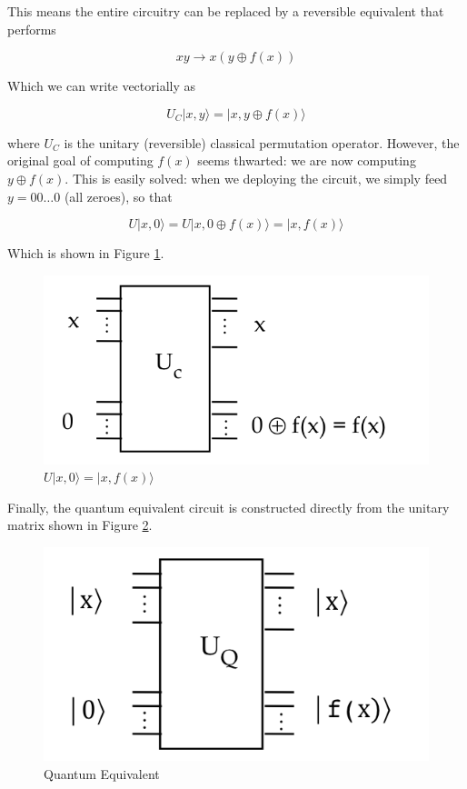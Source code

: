 \documentclass[main.tex]{subfiles}
\begin{document}
    This means the entire circuitry can be replaced by a reversible equivalent that performs
    
    $$
    x y \rightarrow x(y \oplus f(x))
    $$
    
    Which we can write vectorially as
    
    $$
    U_{C}|x, y\rangle=|x, y \oplus f(x)\rangle
    $$
    
    where $U_{C}$ is the unitary (reversible) classical permutation operator. However, the original goal of computing $f(x)$ seems thwarted: we are now computing $y \oplus f(x)$. This is easily solved: when we deploying the circuit, we simply feed $y=00 \ldots 0$ (all zeroes), so that
    
    $$
    U|x, 0\rangle=U|x, 0 \oplus f(x)\rangle=|x, f(x)\rangle
    $$
    
    Which is shown in Figure \ref{fig:35permutation9}.
    
    \begin{figure}
        \centering
        \includegraphics[width=5in]{notes/figs/n10/35permutation9.png}
        \caption{$U|x, 0\rangle=|x, f(x)\rangle$}
        \label{fig:35permutation9}
    \end{figure}
    
    Finally, the quantum equivalent circuit is constructed directly from the unitary matrix shown in Figure \ref{fig:36permutation10}.
    
    \begin{figure}
        \centering
        \includegraphics[width=5in]{notes/figs/n10/36permutation10.png}
        \caption{Quantum Equivalent}
        \label{fig:36permutation10}
    \end{figure}
    
\end{document}
